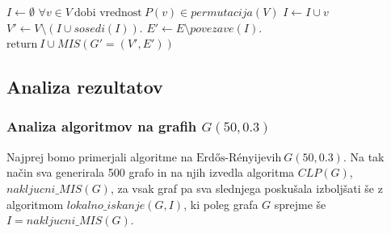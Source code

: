 \documentclass[a4paper, 12pt]{article}
\begin{document}
\newpage

\begin{algorithm}
    \caption{$lokalno\_iskanje(G, I)$}\label{euclid}
    \begin{algorithmic}[1]
    \State $\textit{I} \gets \emptyset$
    \State $\forall v \in V\ \text{dobi vrednost}\ \textit{P}(v) \in \textit{permutacija}(V)$
    \State $ I \gets I \cup v $
    \EndIf
    \State $V' \gets V \setminus (I \cup \textit{sosedi}(I))$.
    \State $E' \gets E \setminus \textit{povezave}(I)$.
    \State $\text{return}\  I \cup \textit{MIS}(G'=(V', E'))$
    \end{algorithmic}
    \end{algorithm}

\subsection{Analiza rezultatov}

\subsubsection{Analiza algoritmov na grafih $G(50, 0.3)$}

Najprej bomo primerjali algoritme na $\text{Erdős-Rényijevih}\ G(50, 0.3)$. Na tak način sva generirala 500 grafo in na njih izvedla algoritma $CLP(G)$, $nakljucni\_MIS(G)$, za vsak graf pa sva slednjega poskušala izboljšati
še z algoritmom $lokalno\_iskanje(G, I)$, ki poleg grafa $G$ sprejme še $I = nakljucni\_MIS(G)$.
\end{document}
